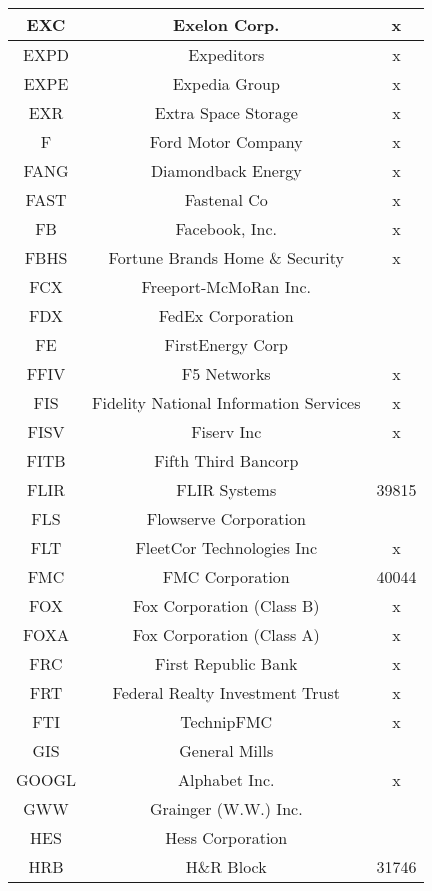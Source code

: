 \documentclass[11pt]{article}
\begin{document}
\begin{onehalfspace}
\begin{longtable}[h!]{|c|c|c|}
        EXC & Exelon Corp. & x \\ \hline
        EXPD & Expeditors & x \\ \hline
        EXPE & Expedia Group & x \\ \hline
        EXR & Extra Space Storage & x \\ \hline
        F & Ford Motor Company & x \\ \hline
        FANG & Diamondback Energy & x \\ \hline
        FAST & Fastenal Co & x \\ \hline
        FB & Facebook, Inc. & x \\ \hline
        FBHS & Fortune Brands Home \& Security & x \\ \hline
        FCX & Freeport-McMoRan Inc. &  \\ \hline
        FDX & FedEx Corporation &  \\ \hline
        FE & FirstEnergy Corp &  \\ \hline
        FFIV & F5 Networks & x \\ \hline
        FIS & Fidelity National Information Services & x \\ \hline
        FISV & Fiserv Inc & x \\ \hline
        FITB & Fifth Third Bancorp &  \\ \hline
        FLIR & FLIR Systems & 39815 \\ \hline
        FLS & Flowserve Corporation &  \\ \hline
        FLT & FleetCor Technologies Inc & x \\ \hline
        FMC & FMC Corporation & 40044 \\ \hline
        FOX & Fox Corporation (Class B) & x \\ \hline
        FOXA & Fox Corporation (Class A) & x \\ \hline
        FRC & First Republic Bank & x \\ \hline
        FRT & Federal Realty Investment Trust & x \\ \hline
        FTI & TechnipFMC & x \\ \hline
        GIS & General Mills &  \\ \hline
        GOOGL & Alphabet Inc. & x \\ \hline
        GWW & Grainger (W.W.) Inc. &  \\ \hline
        HES & Hess Corporation &  \\ \hline
        HRB & H\&R Block & 31746 \\ \hline

\end{longtable}
\end{onehalfspace}
\end{document}
